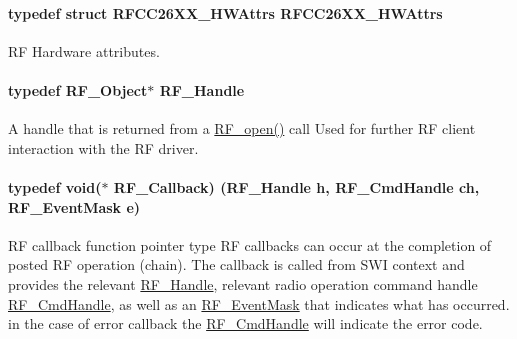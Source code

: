 \paragraph[{R\+F\+C\+C26\+X\+X\+\_\+\+H\+W\+Attrs}]{\setlength{\rightskip}{0pt plus 5cm}typedef struct {\bf R\+F\+C\+C26\+X\+X\+\_\+\+H\+W\+Attrs}  {\bf R\+F\+C\+C26\+X\+X\+\_\+\+H\+W\+Attrs}}\label{_r_f_8h_ac2049f9479d04c217097ca43ffe07c14}


R\+F Hardware attributes. 

\paragraph[{R\+F\+\_\+\+Handle}]{\setlength{\rightskip}{0pt plus 5cm}typedef {\bf R\+F\+\_\+\+Object}$\ast$ {\bf R\+F\+\_\+\+Handle}}\label{_r_f_8h_a5e8ab7fc87fb818f435d9b6226ee573f}


A handle that is returned from a \hyperlink{_r_f_8h_a13a7c6f5a2b797e0aac18fecfaba6f64}{R\+F\+\_\+open()} call Used for further R\+F client interaction with the R\+F driver. 

\paragraph[{R\+F\+\_\+\+Callback}]{\setlength{\rightskip}{0pt plus 5cm}typedef void($\ast$ R\+F\+\_\+\+Callback) ({\bf R\+F\+\_\+\+Handle} h, {\bf R\+F\+\_\+\+Cmd\+Handle} ch, {\bf R\+F\+\_\+\+Event\+Mask} e)}\label{_r_f_8h_a4d2ce6dc70b0f329dc5e249ec10c574a}


R\+F callback function pointer type R\+F callbacks can occur at the completion of posted R\+F operation (chain). The callback is called from S\+W\+I context and provides the relevant \hyperlink{_r_f_8h_a5e8ab7fc87fb818f435d9b6226ee573f}{R\+F\+\_\+\+Handle}, relevant radio operation command handle \hyperlink{_r_f_8h_acab1f56c62a9fd1ad0a91a46b6da23f1}{R\+F\+\_\+\+Cmd\+Handle}, as well as an \hyperlink{_r_f_8h_a128c46e18dbbaa781abb7abafc35233a}{R\+F\+\_\+\+Event\+Mask} that indicates what has occurred. in the case of error callback the \hyperlink{_r_f_8h_acab1f56c62a9fd1ad0a91a46b6da23f1}{R\+F\+\_\+\+Cmd\+Handle} will indicate the error code. 



